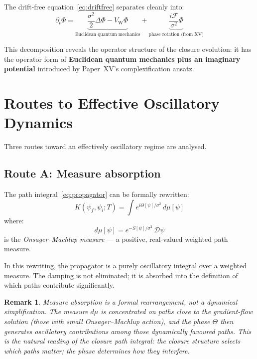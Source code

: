 \documentclass[12pt]{article}
\newtheorem{remark}[theorem]{Remark}
\newcommand{\Fcal}{\mathcal{F}}
\begin{document}
The drift-free equation~\eqref{eq:driftfree} separates cleanly into:
\begin{equation}
    \partial_t \Phi = \underbrace{\frac{\sigma^2}{2}\Delta\Phi - V_{\mathrm{W}}\Phi}_{\text{Euclidean quantum mechanics}} + \underbrace{\frac{i\Fcal}{\sigma^2}\Phi}_{\text{phase rotation (from XV)}}
\end{equation}

This decomposition reveals the operator structure of the closure evolution: it has the operator form of \textbf{Euclidean quantum mechanics plus an imaginary potential} introduced by Paper~XV's complexification ansatz.

\section{Routes to Effective Oscillatory Dynamics}\label{sec:routes}

Three routes toward an effectively oscillatory regime are analysed.

\subsection{Route A: Measure absorption}\label{sec:routeA}

The path integral~\eqref{eq:propagator} can be formally rewritten:
\begin{equation}
    K(\psi_f, \psi_i; T) = \int e^{i\Theta[\psi]/\sigma^2}\, d\mu[\psi]
\end{equation}
where:
\begin{equation}
    d\mu[\psi] = e^{-S[\psi]/\sigma^2}\, \mathcal{D}\psi
\end{equation}
is the \textit{Onsager--Machlup measure} --- a positive, real-valued weighted path measure.

In this rewriting, the propagator is a purely oscillatory integral over a weighted measure. The damping is not eliminated; it is absorbed into the definition of which paths contribute significantly.

\begin{remark}
Measure absorption is a formal rearrangement, not a dynamical simplification. The measure $d\mu$ is concentrated on paths close to the gradient-flow solution (those with small Onsager--Machlup action), and the phase $\Theta$ then generates oscillatory contributions among those dynamically favoured paths. This is the natural reading of the closure path integral: \textit{the closure structure selects which paths matter; the phase determines how they interfere.}
\end{remark}
\end{document}
